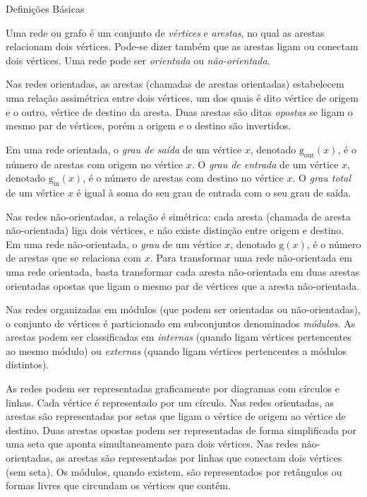 \begin{section}{Definições Básicas}
	
	Uma rede ou grafo é um conjunto de \emph{vértices} e \emph{arestas}, no qual as arestas relacionam dois vértices. Pode-se dizer também que as arestas ligam ou conectam dois vértices. Uma rede pode ser \emph{orientada} ou \emph{não-orientada}. 
	
	Nas redes orientadas, as arestas (chamadas de arestas orientadas) estabelecem uma relação assimétrica entre dois vértices, um dos quais é dito vértice de origem e o outro, vértice de destino da aresta. Duas arestas são ditas \emph{opostas} se ligam o mesmo par de vértices, porém a origem e o destino são invertidos. 
	
	Em uma rede orientada, o \emph{grau de saída} de um vértice $x$, denotado $\mathrm{g}_\mathrm{out}(x)$, é o número de arestas com origem no vértice $x$. O \emph{grau de entrada} de um vértice $x$, denotado $\mathrm{g}_\mathrm{in}(x)$, é o número de arestas com destino no vértice $x$. O \emph{grau total} de um vértice $x$ é igual à soma do seu grau de entrada com o seu grau de saída.
	
	Nas redes não-orientadas, a relação é simétrica: cada aresta (chamada de aresta não-orientada) liga dois vértices, e não existe distinção entre origem e destino. Em uma rede não-orientada, o \emph{grau} de um vértice $x$, denotado $\mathrm{g}(x)$, é o número de arestas que se relaciona com $x$. Para transformar uma rede não-orientada em uma rede orientada, basta transformar cada aresta não-orientada em duas arestas orientadas opostas que ligam o mesmo par de vértices que a aresta não-orientada. 
	
	Nas redes organizadas em módulos (que podem ser orientadas ou não-orientadas), o conjunto de vértices é particionado em subconjuntos denominados \emph{módulos}. As arestas podem ser classificadas em \emph{internas} (quando ligam vértices pertencentes ao mesmo módulo) ou \emph{externas} (quando ligam vértices pertencentes a módulos distintos).
	
	As redes podem ser representadas graficamente por diagramas com círculos e linhas. Cada vértice é representado por um círculo. Nas redes orientadas, as arestas são representadas por setas que ligam o vértice de origem ao vértice de destino. Duas arestas opostas podem ser representadas de forma simplificada por uma seta que aponta simultaneamente para dois vértices. Nas redes não-orientadas, as arestas são representadas por linhas que conectam dois vértices (sem seta). Os módulos, quando existem, são representados por retângulos ou formas livres que circundam os vértices que contêm.

\end{section}

